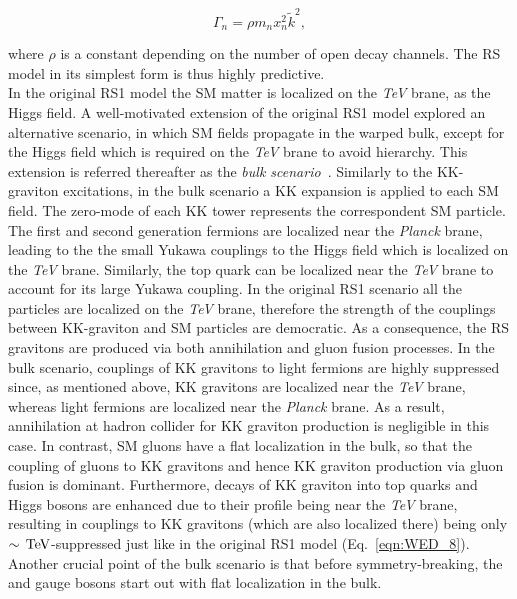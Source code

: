 \begin{equation}\label{eqn:WED_9}
\Gamma_n = \rho m_n x^2_n\tilde{k}^2,
\end{equation}

\noindent where $\rho$ is a constant depending on the number of open decay channels.
The RS model in its simplest form is thus highly predictive.\\

In the original RS1 model the SM matter is localized on the \textit{TeV} brane, as the Higgs field.
A well-motivated extension of the original RS1 model explored an alternative scenario, in which 
SM fields propagate in the warped bulk, except for the Higgs field which is required on the \textit{TeV} brane to avoid hierarchy.
This extension is referred thereafter as the \textit{bulk scenario}~\cite{Agashe:2007zd,Fitzpatrick:2007qr}.
Similarly to the KK-graviton excitations, in the bulk scenario a KK expansion is applied to each SM field.
The zero-mode of each KK tower represents the correspondent SM particle.
The first and second generation fermions are localized near the \textit{Planck} brane, leading to the the small Yukawa couplings to the Higgs field which is localized on the \textit{TeV} brane.
Similarly, the top quark can be localized near the \textit{TeV} brane to account for its large Yukawa coupling.
In the original RS1 scenario all the particles are localized on the \textit{TeV} brane, therefore the strength of the couplings between KK-graviton and SM particles are democratic. 
As a consequence, the RS gravitons are produced via both \qqbar annihilation and gluon fusion processes.
In the bulk scenario, couplings of KK gravitons to light fermions are highly suppressed since, as mentioned above, KK gravitons are localized near the \textit{TeV} brane, whereas light fermions are localized near the \textit{Planck} brane. As a result, \qqbar annihilation at hadron collider for KK graviton production is negligible in this case.
In contrast, SM gluons have a flat localization in the bulk, so that the coupling of gluons to KK gravitons and hence KK graviton production via gluon fusion is dominant.
Furthermore, decays of KK graviton into top quarks and Higgs bosons are enhanced due to their profile being near the \textit{TeV} brane, resulting in couplings to KK gravitons (which are also localized there) being only $\sim\,\text{Te\hspace{-.08em}V}$-suppressed just like in the original RS1 model (Eq.~\ref{eqn:WED_8}).
Another crucial point of the bulk scenario is that before symmetry-breaking, the \PW and \PZ gauge bosons start out with flat localization in the bulk. %
